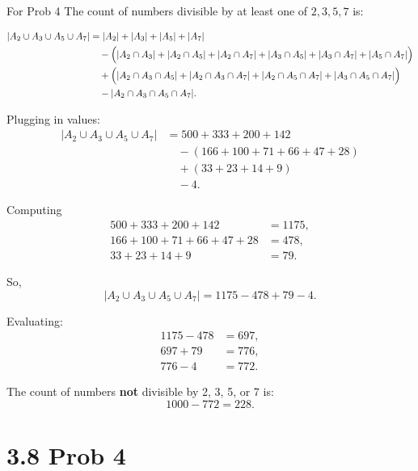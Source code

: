 \documentclass{report}
\begin{document}
\begin{RemarkWithLily}{For Prob 4}
  The count of numbers divisible by at least one of \(2,3,5,7\) is:
  
  \[
  \begin{aligned}
  |A_2 \cup A_3 \cup A_5 \cup A_7| &= |A_2|+|A_3|+|A_5|+|A_7| \\
  &\quad - \Bigl(|A_2 \cap A_3| + |A_2 \cap A_5| + |A_2 \cap A_7| + |A_3 \cap A_5| + |A_3 \cap A_7| + |A_5 \cap A_7|\Bigr)\\
  &\quad + \Bigl(|A_2 \cap A_3 \cap A_5| + |A_2 \cap A_3 \cap A_7| + |A_2 \cap A_5 \cap A_7| + |A_3 \cap A_5 \cap A_7|\Bigr)\\
  &\quad - |A_2 \cap A_3 \cap A_5 \cap A_7|.
  \end{aligned}
  \]
  
  Plugging in values:
  \[
  \begin{aligned}
  |A_2 \cup A_3 \cup A_5 \cup A_7| &= 500 + 333 + 200 + 142 \\
  &\quad - (166 + 100 + 71 + 66 + 47 + 28) \\
  &\quad + (33 + 23 + 14 + 9) \\
  &\quad - 4.
  \end{aligned}
  \]
  
  Computing 
  \[
  \begin{aligned}
  500+333+200+142 &= 1175, \\
  166+100+71+66+47+28 &= 478, \\
  33+23+14+9 &= 79.
  \end{aligned}
  \]
  
  So,
  \[
  |A_2 \cup A_3 \cup A_5 \cup A_7| = 1175 - 478 + 79 - 4.
  \]
  
  Evaluating:
  \[
  \begin{aligned}
  1175 - 478 &= 697, \\
  697 + 79 &= 776, \\
  776 - 4 &= 772.
  \end{aligned}
  \]
  
  The count of numbers \textbf{not} divisible by 2, 3, 5, or 7 is:
  \[
  1000 - 772 = 228.
  \]

\end{RemarkWithLily}

\section*{3.8 Prob 4}

\end{document}
